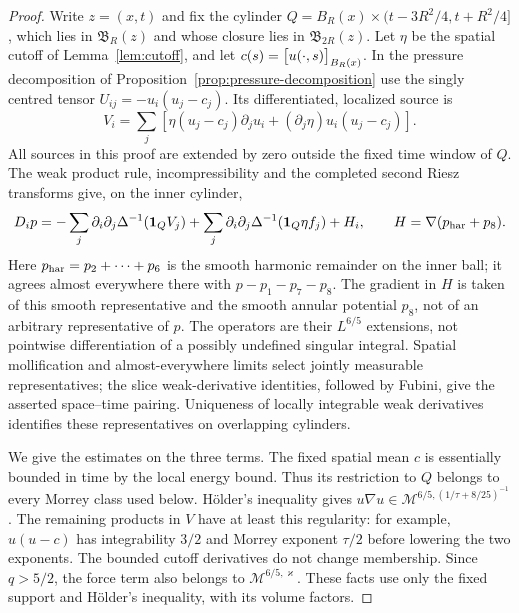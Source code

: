\documentclass[11pt,reqno]{amsart}
\begin{document}
\begin{proof}
Write $z=(x,t)$ and fix the cylinder
$Q=B_R(x)\times(t-3R^2/4,t+R^2/4]$, which lies in
$\mathfrak B_R(z)$ and whose closure lies in $\mathfrak B_{2R}(z)$.
Let $\eta$ be the spatial cutoff of Lemma~\ref{lem:cutoff}, and let
$c(s)=\bigl[u(\cdot,s)\bigr]_{B_R(x)}$.
In the pressure decomposition of Proposition~\ref{prop:pressure-decomposition}
use the singly centred tensor $U_{ij}=-u_i(u_j-c_j)$. Its differentiated,
localized source is
\[
 V_i=\sum_j\left[\eta(u_j-c_j)\partial_j u_i
                    +(\partial_j\eta)u_i(u_j-c_j)\right].
\]
All sources in this proof are extended by zero outside the fixed time
window of $Q$. The weak product rule, incompressibility and the completed
second Riesz transforms give, on the inner cylinder,
\begin{equation}\label{eq:pressure-gradient-decomposition}
 D_i p=-\sum_j\partial_i\partial_j\Delta^{-1}(\mathbf1_Q V_j)
       +\sum_j\partial_i\partial_j\Delta^{-1}(\mathbf1_Q\eta f_j)+H_i,
 \qquad H=\nabla(p_{\rm har}+p_8).
\end{equation}
Here $p_{\rm har}=p_2+\cdots+p_6$ is the smooth harmonic remainder on
the inner ball; it agrees almost everywhere there with $p-p_1-p_7-p_8$.
The gradient in $H$ is taken of this smooth representative and the smooth
annular potential $p_8$, not of an arbitrary representative of $p$.
The operators are their $L^{6/5}$ extensions, not pointwise
differentiation of a possibly undefined singular integral. Spatial
mollification and almost-everywhere limits select jointly measurable
representatives; the slice weak-derivative identities, followed by Fubini,
give the asserted space--time pairing. Uniqueness of locally integrable
weak derivatives identifies these representatives on overlapping cylinders.

We give the estimates on the three terms. The fixed spatial mean $c$ is
essentially bounded in time by the local energy bound. Thus its restriction to $Q$
belongs to every Morrey class used below. H\"older's inequality gives
$u\nabla u\in\mathcal M^{6/5,(1/\tau+8/25)^{-1}}$.
The remaining products in $V$ have at least this regularity: for example,
$u(u-c)$ has integrability $3/2$ and Morrey exponent $\tau/2$ before
lowering the two exponents. The bounded cutoff derivatives do not change
membership. Since $q>5/2$, the force term also belongs to
$\mathcal M^{6/5,\varkappa}$. These facts use only the fixed support and
H\"older's inequality, with its volume factors.


\end{proof}
\end{document}
